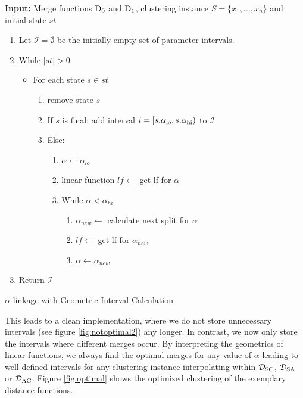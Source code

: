\begin{algorithm}
    \textbf{Input:} Merge functions $\operatorname{D_{0}}$ and $\operatorname{D_{1}}$, clustering instance $S = \{x_1, \dots, x_n\}$ and initial state $st$
    \begin{enumerate}[nosep, leftmargin=*]
    \item Let $\mathcal{I} = \emptyset$ be the initially empty set of parameter intervals.
    \item While $|st| > 0$
    \begin{itemize}[nosep, leftmargin=*]
        \item For each state $s \in st$
        \begin{enumerate}
            \item remove state $s$\;
            \item If $s$ is final: add interval $i = [s.\alpha_\text{lo}, s.\alpha_\text{hi})$ to $\mathcal{I}$
            \item Else: 
            \begin{enumerate}
                \item $\alpha \gets \alpha_{lo}$\;
                \item linear function $lf \gets$ get lf for $\alpha$
                \item While $\alpha < \alpha_{hi}$
                \begin{enumerate}
                    \item $\alpha_{new} \gets$ calculate next split for $\alpha$
                    \item $lf \gets$ get lf for $\alpha_{new}$\;
                    \item $\alpha \gets \alpha_{new}$
                \end{enumerate}
            \end{enumerate}
        \end{enumerate}
    \end{itemize}
    \item Return $\mathcal{I}$
    \end{enumerate}
    \caption{$\alpha$-linkage with Geometric Interval Calculation}
    \label{alg:alphalinkage4}
\end{algorithm}

This leads to a clean implementation, where we do not store unnecessary intervals (see figure \ref{fig:notoptimal2}) any longer. In contrast, we now only store the intervals where different merges occur. By interpreting the geometrics of linear functions, we always find the optimal merges for any value of $\alpha$ leading to well-defined intervals for any clustering instance interpolating within $\mathcal{D}_\text{SC}$, $\mathcal{D}_\text{SA}$ or $\mathcal{D}_\text{AC}$. Figure \ref{fig:optimal} shows the optimized clustering of the exemplary distance functions.

